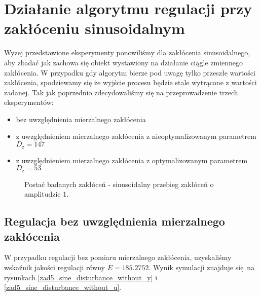 \section{Działanie algorytmu regulacji przy zakłóceniu sinusoidalnym}
\label{zad5_sine_dist}
Wyżej przedstawione eksperymenty ponowiliśmy dla zakłócenia sinusoidalnego, aby zbadać
jak zachowa się obiekt wystawiony na działanie ciągle zmiennego zakłócenia. W przypadku
gdy algorytm bierze pod uwagę tylko przeszłe wartości zakłócenia, spodziewamy się że 
wyjście procesu będzie stale wytrącone z wartości zadanej. Tak jak poprzednio zdecydowaliśmy
się na przeprowadzenie trzech eksperymentów:

\begin{itemize}
    \item bez uwzględnienia mierzalnego zakłócenia
    \item z uwzględnieniem mierzalnego zakłócenia z nieoptymalizowanym parametrem $D_{\mathrm{z}} = \num{147}$
    \item z uwzględnieniem mierzalnego zakłócenia z optymalizowanym parametrem $D_{\mathrm{z}} = \num{53}$
\end{itemize}

\begin{figure}[b]
    \centering
    \caption{Postać badanych zakłóceń - sinusoidalny przebieg zakłóceń o amplitudzie $\num{1}$.}
    \label{zad5_sine_disturbance_z}
\end{figure}
\FloatBarrier


\subsection{Regulacja bez uwzględnienia mierzalnego zakłócenia}
W przypadku regulacji bez pomiaru mierzalnego zakłócenia, uzyskaliśmy wskaźnik jakości regulacji
równy $E = \num{185,2752}$. Wynik symulacji znajduje się na rysunkach \ref{zad5_sine_disturbance_without_y}
i \ref{zad5_sine_disturbance_without_u}.

